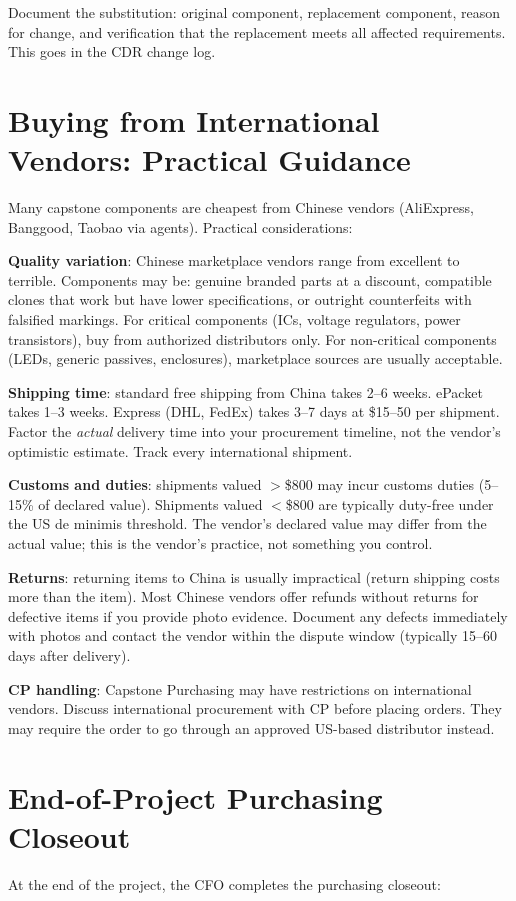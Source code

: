 Document the substitution: original component, replacement component, reason for change, and verification that the replacement meets all affected requirements. This goes in the CDR change log.



\section{Buying from International Vendors: Practical Guidance}
Many capstone components are cheapest from Chinese vendors (AliExpress, Banggood, Taobao via agents). Practical considerations:

\textbf{Quality variation}: Chinese marketplace vendors range from excellent to terrible. Components may be: genuine branded parts at a discount, compatible clones that work but have lower specifications, or outright counterfeits with falsified markings. For critical components (ICs, voltage regulators, power transistors), buy from authorized distributors only. For non-critical components (LEDs, generic passives, enclosures), marketplace sources are usually acceptable.

\textbf{Shipping time}: standard free shipping from China takes 2--6 weeks. ePacket takes 1--3 weeks. Express (DHL, FedEx) takes 3--7 days at \$15--50 per shipment. Factor the \emph{actual} delivery time into your procurement timeline, not the vendor's optimistic estimate. Track every international shipment.

\textbf{Customs and duties}: shipments valued $>$\$800 may incur customs duties (5--15\% of declared value). Shipments valued $<$\$800 are typically duty-free under the US de minimis threshold. The vendor's declared value may differ from the actual value; this is the vendor's practice, not something you control.

\textbf{Returns}: returning items to China is usually impractical (return shipping costs more than the item). Most Chinese vendors offer refunds without returns for defective items if you provide photo evidence. Document any defects immediately with photos and contact the vendor within the dispute window (typically 15--60 days after delivery).

\textbf{CP handling}: Capstone Purchasing may have restrictions on international vendors. Discuss international procurement with CP before placing orders. They may require the order to go through an approved US-based distributor instead.



\section{End-of-Project Purchasing Closeout}
At the end of the project, the CFO completes the purchasing closeout:

